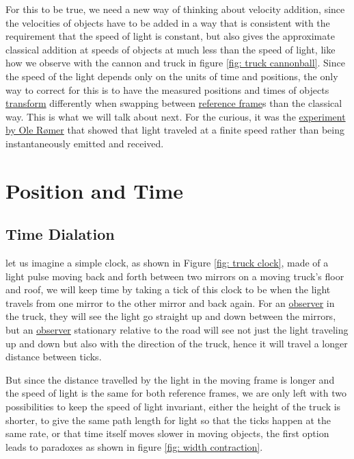 For this to be true, we need a new way of thinking about velocity addition, since the velocities of objects have to be added in a way that is consistent with the requirement that the speed of light is constant, but also gives the approximate classical addition at speeds of objects at much less than the speed of light, like how we observe with the cannon and truck in figure \ref{fig: truck cannonball}. Since the speed of the light depends only on the units of time and positions, the only way to correct for this is to have the measured positions and times of objects \hyperlink{def-transform}{transform} differently when swapping between \hyperlink{def-Reference-frame}{reference frame}s than the classical way. This is what we will talk about next.
For the curious, it was the \href{https://scienceready.com.au/pages/determination-of-speed-of-light}{experiment by Ole Rømer} that showed that light traveled at a finite speed rather than being instantaneously emitted and received.

\section{Position and Time}

\subsection{Time Dialation}\label{Subsect: Time Dialation}

let us imagine a simple clock, as shown in Figure \ref{fig: truck clock}, made of a light pulse moving back and forth between two mirrors on a moving truck's floor and roof, we will keep time by taking a tick of this clock to be when the light travels from one mirror to the other mirror and back again. For an \hyperlink{def-observer}{observer} in the truck, they will see the light go straight up and down between the mirrors, but an \hyperlink{def-observer}{observer} stationary relative to the road will see not just the light traveling up and down but also with the direction of the truck, hence it will travel a longer distance between ticks.

But since the distance travelled by the light in the moving frame is longer and the speed of light is the same for both reference frames, we are only left with two possibilities to keep the speed of light invariant, either the height of the truck is shorter, to give the same path length for light so that the ticks happen at the same rate, or that time itself moves slower in moving objects, the first option leads to paradoxes as shown in figure \ref{fig: width contraction}.

